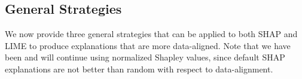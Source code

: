 \documentclass[12pt]{article}  %
\begin{document}
                

                
    \subsection{General Strategies}
        We now provide three general strategies that can be applied to both SHAP and LIME to produce explanations that are more data-aligned. Note that we have been and will continue using normalized Shapley values, since default SHAP explanations are not better than random with respect to data-alignment. %
\end{document}
